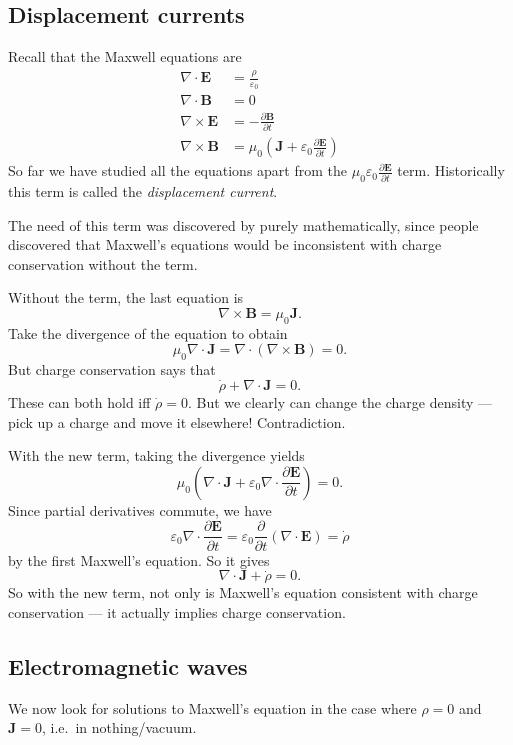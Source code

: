 \documentclass[a4paper]{article}
\begin{document}
\subsection{Displacement currents}
Recall that the Maxwell equations are
\begin{align*}
  \nabla \cdot \mathbf{E} &= \frac{\rho}{\varepsilon_0}\\
  \nabla \cdot \mathbf{B} &= 0\\
  \nabla \times \mathbf{E} &= -\frac{\partial \mathbf{B}}{\partial t}\\
  \nabla \times \mathbf{B} &= \mu_0\left(\mathbf{J} + \varepsilon_0 \frac{\partial \mathbf{E}}{\partial t}\right)
\end{align*}
So far we have studied all the equations apart from the $\mu_0\varepsilon_0 \frac{\partial \mathbf{E}}{\partial t}$ term. Historically this term is called the \emph{displacement current}.

The need of this term was discovered by purely mathematically, since people discovered that Maxwell's equations would be inconsistent with charge conservation without the term.

Without the term, the last equation is
\[
  \nabla \times \mathbf{B} = \mu_0 \mathbf{J}.
\]
Take the divergence of the equation to obtain
\[
  \mu_0 \nabla\cdot \mathbf{J} = \nabla\cdot (\nabla\times \mathbf{B}) = 0.
\]
But charge conservation says that
\[
  \dot{\rho} + \nabla\cdot \mathbf{J} = 0.
\]
These can both hold iff $\dot{\rho} = 0$. But we clearly can change the charge density --- pick up a charge and move it elsewhere! Contradiction.


With the new term, taking the divergence yields
\[
  \mu_0\left(\nabla\cdot \mathbf{J} + \varepsilon_0 \nabla\cdot \frac{\partial \mathbf{E}}{\partial t}\right) = 0.
\]
Since partial derivatives commute, we have
\[
  \varepsilon_0\nabla\cdot \frac{\partial \mathbf{E}}{\partial t} = \varepsilon_0 \frac{\partial}{\partial t} (\nabla\cdot \mathbf{E}) = \dot{\rho}
\]
by the first Maxwell's equation. So it gives
\[
  \nabla\cdot \mathbf{J} + \dot{\rho} = 0.
\]
So with the new term, not only is Maxwell's equation consistent with charge conservation --- it actually implies charge conservation.

\subsection{Electromagnetic waves}
We now look for solutions to Maxwell's equation in the case where $\rho = 0$ and $\mathbf{J} = 0$, i.e.\ in nothing/vacuum.
\end{document}
